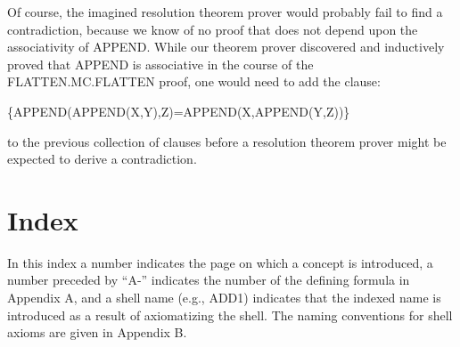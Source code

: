 \documentclass[11pt]{book}
\newenvironment{pubasis}{\begin{flushleft}\ttfamily\small}{\normalsize\rmfamily\end{flushleft}}
\newcommand{\pubdefaulttextsize}{\large}
\begin{document}
Of course, the imagined resolution theorem prover would probably fail to find
a contradiction, because we know of no proof that does not depend
upon the associativity of APPEND.  While our theorem prover discovered
and inductively proved that APPEND is associative in the course of
the FLAT\-TEN.MC.FLAT\-TEN proof, one would need to add the clause:
\begin{pubasis}
\{APPEND(APPEND(X,Y),Z)=APPEND(X,APPEND(Y,Z))\}\\
\end{pubasis}
to the previous collection of clauses before a resolution theorem
prover might be expected to derive a contradiction.

\backmatter
\chapter{Index}
\label{APPINDEX}
\pubdefaulttextsize
In this index a number indicates the page on which a concept
is introduced, a number preceded by ``A-'' indicates the
number of the defining formula in Appendix A, and a shell
name (e.g., ADD1) indicates that the indexed name is
introduced as a result of axiomatizing the shell.  The
naming conventions for shell axioms are given in Appendix B.
\end{document}
